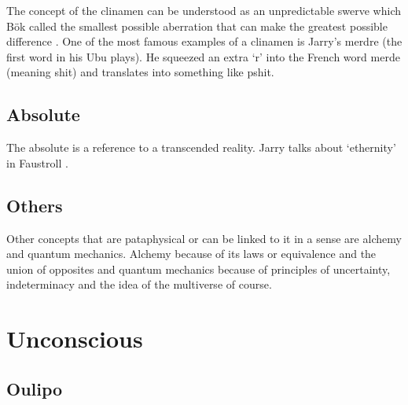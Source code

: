 The concept of the clinamen can be understood as an unpredictable swerve which Bök called the smallest possible aberration that can make the greatest possible difference \citep{Bok2002}. One of the most famous examples of a clinamen is Jarry's merdre (the first word in his Ubu plays). He squeezed an extra `r' into the French word merde (meaning shit) and translates into something like pshit.


\subsection{Absolute}

The absolute is a reference to a transcended reality. Jarry talks about `ethernity' in Faustroll \citep[p.104]{Jarry1996}.


\subsection*{Others}

Other concepts that are pataphysical or can be linked to it in a sense are alchemy and quantum mechanics. Alchemy because of its laws or equivalence and the union of opposites \citep{Hugill2012} and quantum mechanics because of principles of uncertainty, indeterminacy and the idea of the multiverse of course.

\section{Unconscious}


\subsection{Oulipo}


